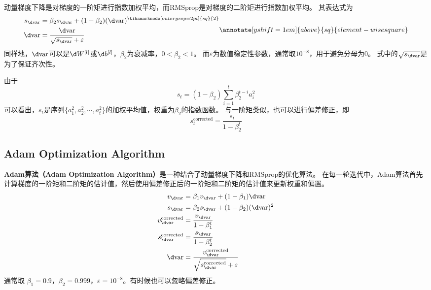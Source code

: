动量梯度下降是对梯度的一阶矩进行指数加权平均，而RMSprop是对梯度的二阶矩进行指数加权平均。
其表达式为
\begin{equation}
    \begin{aligned}
        s_{\d \mathrm{var}} &= \beta_2 s_{\d \mathrm{var}} + (1 - \beta_2)(\d \mathrm{var})^{\tikzmarknode[outer ysep=2pt]{sq}{2}} \\
        \d \mathrm{var} &= \frac{\d \mathrm{var}}{\sqrt{s_{\d \mathrm{var}}} + \varepsilon}
    \end{aligned}
    \annotate[yshift=1em]{above}{sq}{element-wise square}
    \label{eq:rmsprop}
\end{equation}
同样地，$\d \mathrm{var}$可以是$\d W^{[l]}$或$\d b^{[l]}$，$\beta_2$为衰减率，$0 < \beta_2 < 1$。
而$\varepsilon$为数值稳定性参数，通常取$10^{-8}$，用于避免分母为0。
式中的$\sqrt{s_{\d \mathrm{var}}}$是为了保证齐次性。

由于
\begin{equation}
    s_t = (1 - \beta_2)\sum_{i=1}^t\beta_2^{t-i}a_i^2
\end{equation}
可以看出，$s_t$是序列$\{a_1^2, a_2^2, \cdots, a_t^2\}$的加权平均值，权重为$\beta_2$的指数函数。
与一阶矩类似，也可以进行偏差修正，即
\begin{equation}
    s_t^{\mathrm{corrected}} = \frac{s_t}{1 - \beta_2^t}
\end{equation}

\subsection{Adam Optimization Algorithm}

\textbf{Adam算法（Adam Optimization Algorithm）}是一种结合了动量梯度下降和RMSprop的优化算法。
在每一轮迭代中，Adam算法首先计算梯度的一阶矩和二阶矩的估计值，然后使用偏差修正后的一阶矩和二阶矩的估计值来更新权重和偏置。
\begin{equation}
    \begin{aligned}
        v_{\d \mathrm{var}} &= \beta_1 v_{\d \mathrm{var}} + (1 - \beta_1)\d \mathrm{var} \\
        s_{\d \mathrm{var}} &= \beta_2 s_{\d \mathrm{var}} + (1 - \beta_2)(\d \mathrm{var})^2 \\
        v_{\d \mathrm{var}}^{\mathrm{corrected}} &= \frac{v_{\d \mathrm{var}}}{1 - \beta_1^t} \\
        s_{\d \mathrm{var}}^{\mathrm{corrected}} &= \frac{s_{\d \mathrm{var}}}{1 - \beta_2^t} \\
        \d \mathrm{var} &= \frac{v_{\d \mathrm{var}}^{\mathrm{corrected}}}{\sqrt{s_{\d \mathrm{var}}^{\mathrm{corrected}}} + \varepsilon}
    \end{aligned}
\end{equation}
通常取 $\beta_1 = 0.9$，$\beta_2 = 0.999$，$\varepsilon = 10^{-8}$。有时候也可以忽略偏差修正。

